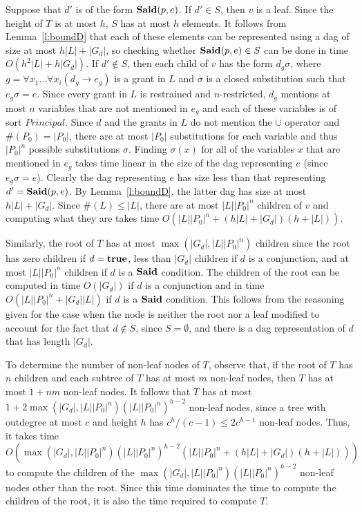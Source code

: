 \documentclass{acmtrans2m}
\newcommand{\<}{
}
\renewcommand{\>}{\rangle}
\newcommand{\union}{\cup}
\newcommand{\len}[1]{|#1|}
\newcommand{\card}[1]{\#({#1})}
\newcommand{\Said}{\mathit{\bf Said}}
\newcommand{\true}{\mathit{\bf{true}}}
\newcommand{\cd}{d}
\newcommand{\cc}{e}
\newcommand{\imp}{\rightarrow}
\newcommand{\Princ}{\mathit{Principal}}
\begin{document}
\begin{sloppypar}
Suppose that $\cd'$ is of the form $\Said(p,\cc)$.  If $\cd'\in S$, then $v$ is a leaf.
Since the height of $T$ is at most $h$, $S$ has at most $h$ elements.  It follows from
Lemma~\ref{l:boundD} that each of these elements can be represented using a dag of size
at most $h\len{L} + \len{G_{\cd}}$, so checking whether $\Said(p,\cc) \in S$ can be
done in time $O(h^2\len{L} + h \len{G_{\cd}})$.  If $\cd' \notin S$, then each child of
$v$ has the form $\cd_g\sigma$, where $g= \forall x_1\ldots\forall x_i(\cd_g\imp\cc_g)$
is a grant in $L$ and $\sigma$ is a closed substitution such that $\cc_g\sigma = \cc$.
Since every grant in $L$ is restrained and $n$-restricted, $\cd_g$ mentions at most $n$
variables that are not mentioned in $\cc_g$ and each of these variables is of sort
$\Princ$.  Since $\cd$ and the grants in $L$ do not mention the $\union$ operator and
$\card{P_0} = \len{P_0}$, there are at most $\len{P_0}$ substitutions for each variable
and thus $\len{P_0}^n$ possible substitutions $\sigma$.  Finding $\sigma(x)$ for all of
the variables $x$ that are mentioned in $\cc_g$ takes time linear in the size of the dag
representing $\cc$ (since $\cc_g\sigma = \cc$).  Clearly the dag representing $\cc$ has
size less than that representing $\cd' = \Said(p,\cc)$. By Lemma~\ref{l:boundD}, the
latter dag has size at most $h\len{L}  + \len{G_{\cd}}$.  Since $\card{L}\le \len{L}$,
there are at most $|L|\len{P_0}^n$ children of $v$ and computing what they are takes
time $O(\len{L}\len{P_0}^n + (h\len{L} + \len{G_{\cd}})(h + \len{L}))$.

Similarly, the root of $T$ has at most $ \max(\len{G_d}, \len{L}\len{P_0}^n) $ children since the root
has zero children if $\cd = \true$, less than $\len{G_d}$ children if $\cd$ is a conjunction, and at most
$\len{L}\len{P_0}^n$ children if $\cd$ is a $\Said$ condition.  The children of the root can be computed
in time $O(\len{G_d})$ if $\cd$ is a conjunction and in time $O(\len{L}\len{P_0}^n + \len{G_d}\len{L})$ if
$\cd$ is a $\Said$ condition.  This follows from the reasoning given for the case when the node is neither
the root nor a leaf modified to account for the fact that $\cd \not\in S$, since $S =\emptyset$, and there
is a dag representation of $\cd$ that has length $\len{G_d}$.

To determine the number of non-leaf nodes of $T$, observe that, if the root of $T$ has $n$ children and
each subtree of $T$ has at most $m$ non-leaf nodes, then $T$ has at most $1 +nm$ non-leaf nodes.  It
follows that $T$ has at most $1 +2\max(\len{G_d}, \len{L}\len{P_0}^n) (\len{L}\len{P_0}^n)^{h-2}$ non-leaf
nodes, since a tree with outdegree at most $c$ and height $h$ has $c^h/(c-1) \le 2c^{h-1}$ non-leaf
nodes.  Thus, it takes time
$$
O(\max(\len{G_d}, \len{L}\len{P_0}^n) (\len{L}\len{P_0}^n)^{h-2}
(\len{L}\len{P_0}^n + (h\len{L} + \len{G_{\cd}})(h + \len{L})))
$$
to compute the children of the $\max(\len{G_d},\len{L}\len{P_0}^n) (\len{L}\len{P_0}^n)^{h-2}$
non-leaf nodes other than the root.  Since this time dominates the time to compute the children of the
root, it is also the time required to compute $T$.


\end{sloppypar}
\end{document}
